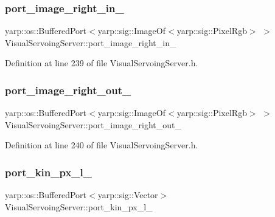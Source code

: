 \subsubsection{\texorpdfstring{port\+\_\+image\+\_\+right\+\_\+in\+\_\+}{port\_image\_right\_in\_}}
{\footnotesize\ttfamily yarp\+::os\+::\+Buffered\+Port$<$yarp\+::sig\+::\+Image\+Of$<$yarp\+::sig\+::\+Pixel\+Rgb$>$ $>$ Visual\+Servoing\+Server\+::port\+\_\+image\+\_\+right\+\_\+in\+\_\+\hspace{0.3cm}{\ttfamily [private]}}



Definition at line 239 of file Visual\+Servoing\+Server.\+h.

\mbox{\label{classVisualServoingServer_ab5c7a20d3e8545331970517c75d79f2a}} 
\subsubsection{\texorpdfstring{port\+\_\+image\+\_\+right\+\_\+out\+\_\+}{port\_image\_right\_out\_}}
{\footnotesize\ttfamily yarp\+::os\+::\+Buffered\+Port$<$yarp\+::sig\+::\+Image\+Of$<$yarp\+::sig\+::\+Pixel\+Rgb$>$ $>$ Visual\+Servoing\+Server\+::port\+\_\+image\+\_\+right\+\_\+out\+\_\+\hspace{0.3cm}{\ttfamily [private]}}



Definition at line 240 of file Visual\+Servoing\+Server.\+h.

\mbox{\label{classVisualServoingServer_a5c6969762a136abeb5de050637e6fbc7}} 
\subsubsection{\texorpdfstring{port\+\_\+kin\+\_\+px\+\_\+l\+\_\+}{port\_kin\_px\_l\_}}
{\footnotesize\ttfamily yarp\+::os\+::\+Buffered\+Port$<$yarp\+::sig\+::\+Vector$>$ Visual\+Servoing\+Server\+::port\+\_\+kin\+\_\+px\+\_\+l\+\_\+\hspace{0.3cm}{\ttfamily [private]}}



